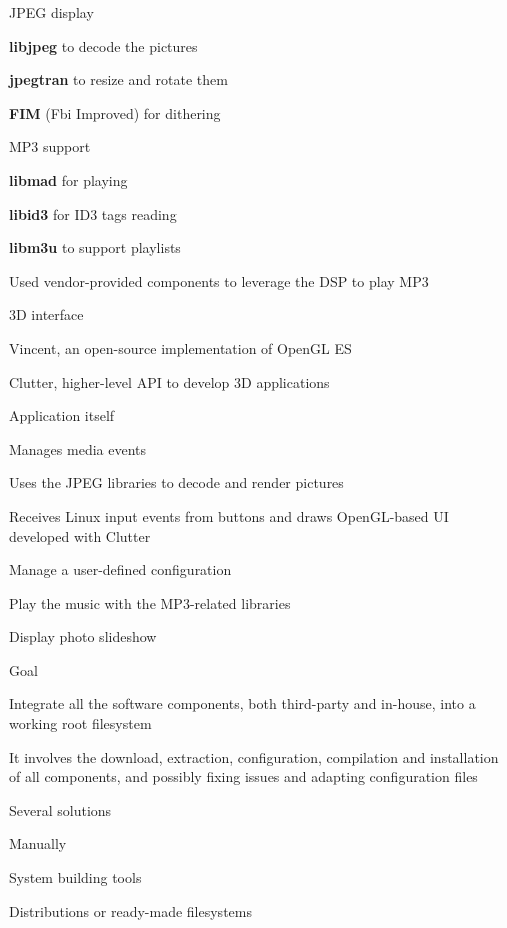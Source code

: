   \startitemize
  \item JPEG display
    \startitemize
    \item {\bf libjpeg} to decode the pictures
    \item {\bf jpegtran} to resize and rotate them
    \item {\bf FIM} (Fbi Improved) for dithering
    \stopitemize
  \item MP3 support
    \startitemize
    \item {\bf libmad} for playing
    \item {\bf libid3} for ID3 tags reading
    \item {\bf libm3u} to support playlists
    \item Used vendor-provided components to leverage the DSP to play
      MP3
    \stopitemize
  \stopitemize

  \startitemize
  \item 3D interface
    \startitemize
    \item Vincent, an open-source implementation of OpenGL ES
    \item Clutter, higher-level API to develop 3D applications
    \stopitemize
  \item Application itself
    \startitemize
    \item Manages media events
    \item Uses the JPEG libraries to decode and render pictures
    \item Receives Linux input events from buttons and draws
      OpenGL-based UI developed with Clutter
    \item Manage a user-defined configuration
    \item Play the music with the MP3-related libraries
    \item Display photo slideshow
    \stopitemize
  \stopitemize


  \startitemize
  \item Goal
    \startitemize
    \item Integrate all the software components, both third-party and
      in-house, into a working root filesystem
    \item It involves the download, extraction, configuration,
      compilation and installation of all components, and possibly
      fixing issues and adapting configuration files
    \stopitemize
  \item Several solutions
    \startitemize
    \item Manually
    \item System building tools
    \item Distributions or ready-made filesystems
    \stopitemize
  \stopitemize

